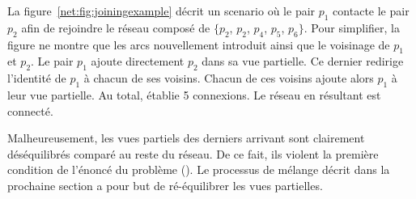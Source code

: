 La figure~\ref{net:fig:joiningexample} décrit un scenario où le pair $p_1$ contacte
le pair $p_2$ afin de rejoindre le réseau composé de $\{p_2$, $p_2$, $p_4$,
$p_5$, $p_6\}$. Pour simplifier, la figure ne montre que les arcs nouvellement
introduit ainsi que le voisinage de $p_1$ et $p_2$. Le pair $p_1$ ajoute
directement $p_2$ dans sa vue partielle. Ce dernier redirige l'identité de $p_1$
à chacun de ses voisins.  Chacun de ces voisins ajoute alors $p_1$ à leur vue
partielle. Au total, \SPRAY établie 5 connexions. Le réseau en résultant est
connecté.

Malheureusement, les vues partiels des derniers arrivant sont clairement
déséquilibrés comparé au reste du réseau. De ce fait, ils violent la première
condition de l'énoncé du problème (\REF). Le processus de mélange décrit dans la
prochaine section a pour but de ré-équilibrer les vues partielles.

